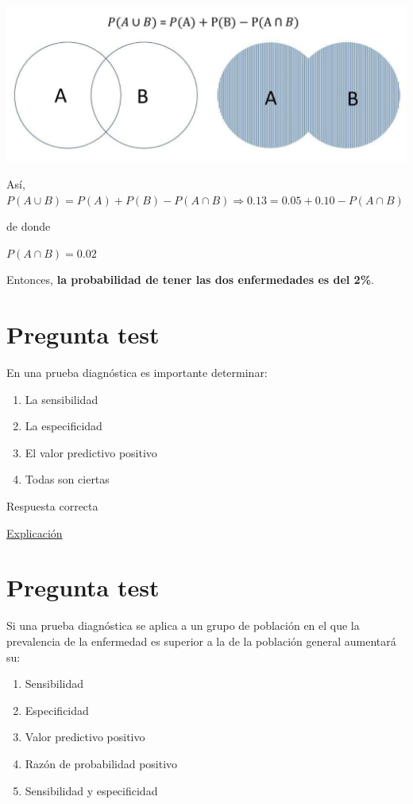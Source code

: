 \documentclass[
]{book}
\providecommand{\tightlist}{%
  \setlength{\itemsep}{0pt}\setlength{\parskip}{0pt}}
\begin{document}
\includegraphics[width=16.03in]{img/7_1}

Así, \(P(A \cup B)=P(A)+P(B)-P(A \cap B) \Rightarrow 0.13=0.05 + 0.10 - P(A \cap B)\)

de donde

\(P(A \cap B)=0.02\)

Entonces, \textbf{la probabilidad de tener las dos enfermedades es del 2\%}.

\hypertarget{pregunta-test-111}{%
\section{Pregunta test}\label{pregunta-test-111}}

En una prueba diagnóstica es importante determinar:

\begin{enumerate}
\def\labelenumi{\alph{enumi})}
\tightlist
\item
  La sensibilidad
\item
  La especificidad
\item
  El valor predictivo positivo
\item
  Todas son ciertas
\end{enumerate}

Respuesta correcta

\href{https://1fjmanzano.github.io/bioestadistica/relaci\%C3\%B3n-entre-variables-cualitativas.html\#diagno\%CC\%81stico-cli\%CC\%81nico}{Explicación}

\hypertarget{pregunta-test-112}{%
\section{Pregunta test}\label{pregunta-test-112}}

Si una prueba diagnóstica se aplica a un grupo de población en el que la prevalencia de la enfermedad es superior a la de la población general aumentará su:

\begin{enumerate}
\def\labelenumi{\alph{enumi})}
\tightlist
\item
  Sensibilidad
\item
  Especificidad
\item
  Valor predictivo positivo
\item
  Razón de probabilidad positivo
\item
  Sensibilidad y especificidad
\end{enumerate}
\end{document}
